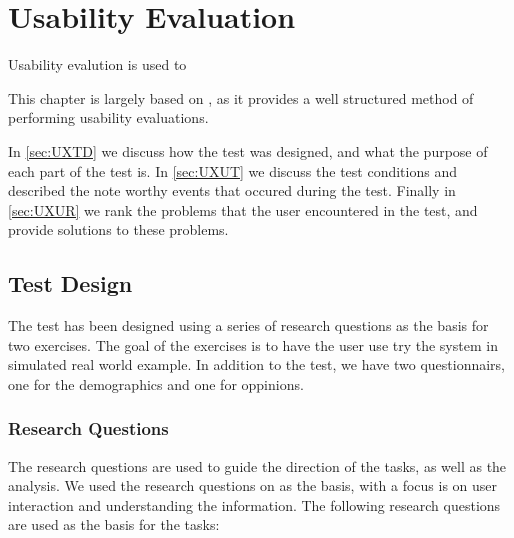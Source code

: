 \chapter{Usability Evaluation}\label{cha:usability}

Usability evalution is used to 

This chapter is largely based on \citep[p. 65-72 and 269-275]{UXBook}, as
it provides a well structured method of performing usability evaluations.\nl

In \autoref{sec:UXTD} we discuss how the test was designed, and what the
purpose of each part of the test is. In \autoref{sec:UXUT} we discuss the test
conditions and described the note worthy events that occured during the test.
Finally in \autoref{sec:UXUR} we rank the problems that the user encountered in
the test, and provide solutions to these problems.


\section{Test Design}\label{sec:UXTD}
The test has been designed using a series of research questions as the basis
for two exercises. The goal of the exercises is to have the user use try the
system in simulated real world example. In addition to the test, we have two
questionnairs, one for the demographics and one for oppinions.

\subsection{Research Questions}\label{subsec:UXRQ}
The research questions are used to guide the direction of the tasks, as well as
the analysis. We used the research questions on \citep[p. 70-71]{UXBook} as the
basis, with a focus is on user interaction and understanding the information.
The following research questions are used as the basis for the tasks:

